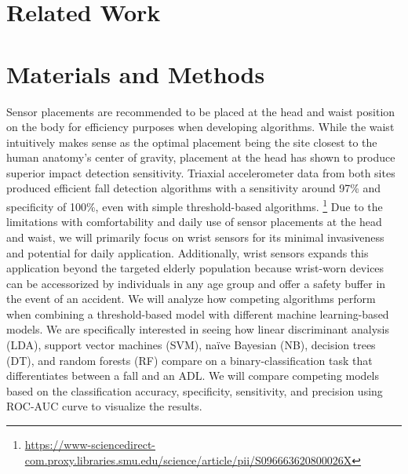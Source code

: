 \documentclass{llncs}
\begin{document}
	
	
\section{Related Work} %
\section{Materials and Methods}
	Sensor placements are recommended to be placed at the head and waist position on the body for efficiency purposes when developing algorithms. While the waist intuitively makes sense as the optimal placement being the site closest to the human anatomy's center of gravity, placement at the head has shown to produce superior impact detection sensitivity. Triaxial accelerometer data from both sites produced efficient fall detection algorithms with a sensitivity around 97\% and specificity of 100\%, even with simple threshold-based algorithms. \footnote{\url{https://www-sciencedirect-com.proxy.libraries.smu.edu/science/article/pii/S096663620800026X}} Due to the limitations with comfortability and daily use of sensor placements at the head and waist, we will primarily focus on wrist sensors for its minimal invasiveness and potential for daily application. Additionally, wrist sensors expands this application beyond the targeted elderly population because wrist-worn devices can be accessorized by individuals in any age group and offer a safety buffer in the event of an accident. 
	We will analyze how competing algorithms perform when combining a threshold-based model with different machine learning-based models. We are specifically interested in seeing how linear discriminant analysis (LDA), support vector machines (SVM), naïve Bayesian (NB), decision trees (DT), and random forests (RF) compare on a binary-classification task that differentiates between a fall and an ADL. We will compare competing models based on the classification accuracy, specificity, sensitivity, and precision using ROC-AUC curve to visualize the results. 
\end{document}
